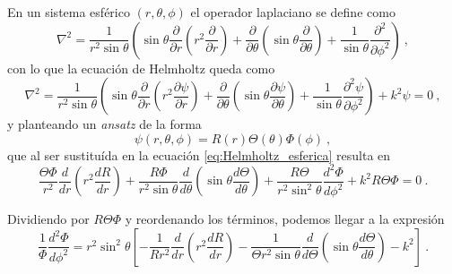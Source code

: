 En un sistema esférico $(r, \theta,\phi)$ el operador laplaciano se define como
\begin{equation}
    \nabla^2 = \frac{1}{r^2 \sin\theta} \left( \sin\theta \frac{\partial}{\partial r}\left( r^2 \frac{\partial}{\partial r} \right) + \frac{\partial}{\partial \theta} \left( \sin\theta \frac{\partial}{\partial \theta} \right) + \frac{1}{\sin\theta} \frac{\partial^2}{\partial \phi^2} \right) \ ,
\end{equation}
con lo que la ecuación de Helmholtz queda como
\begin{equation} \label{eq:Helmholtz_esferica}
    \nabla^2 = \frac{1}{r^2 \sin\theta} \left( \sin\theta \frac{\partial}{\partial r}\left( r^2 \frac{\partial \psi}{\partial r} \right) + \frac{\partial}{\partial \theta} \left( \sin\theta \frac{\partial \psi}{\partial \theta} \right) + \frac{1}{\sin\theta} \frac{\partial^2 \psi}{\partial \phi^2} \right) + k^2\psi = 0 \ ,
\end{equation}
y planteando un \emph{ansatz} de la forma
\begin{equation}
    \psi(r,\theta, \phi) = R(r) \Theta(\theta) \Phi(\phi) \ ,
\end{equation}
que al ser sustituída en la ecuación \eqref{eq:Helmholtz_esferica} resulta en
\begin{equation}
    \frac{\Theta \Phi}{r^2} \frac{d}{dr}\left( r^2 \frac{dR}{dr} \right) + \frac{R\Phi}{r^2\sin\theta} \frac{d}{d \theta} \left( \sin\theta \frac{d\Theta}{d \theta} \right) + \frac{R\Theta}{r^2\sin^2\theta} \frac{d^2\Phi}{d \phi^2} + k^2 R \Theta \Phi = 0 \ .
\end{equation}

Dividiendo por $R\Theta\Phi$ y reordenando los términos, podemos llegar a la expresión
\begin{equation}
    \frac{1}{\Phi} \frac{d^2\Phi}{d\phi^2} = r^2\sin^2\theta \left[ -\frac{1}{Rr^2} \frac{d}{dr}\left( r^2 \frac{dR}{dr} \right) - \frac{1}{\Theta r^2\sin\theta} \frac{d}{d\Theta} \left( \sin\theta \frac{d\Theta}{d\theta} \right) - k^2 \right] \ .
\end{equation}

